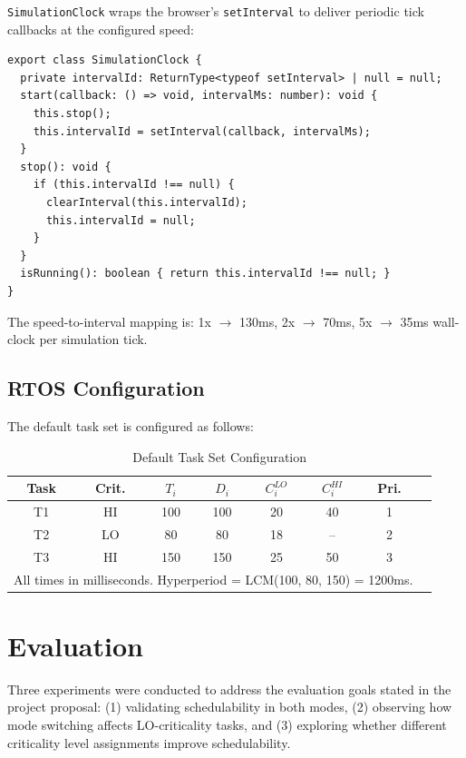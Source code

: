\documentclass[conference]{IEEEtran}
\begin{document}
\texttt{SimulationClock} wraps the browser's \texttt{setInterval} to deliver periodic tick callbacks at the configured speed:

\begin{lstlisting}[caption={Simulation clock (SimulationClock.ts)},label={lst:clock}]
export class SimulationClock {
  private intervalId: ReturnType<typeof setInterval> | null = null;
  start(callback: () => void, intervalMs: number): void {
    this.stop();
    this.intervalId = setInterval(callback, intervalMs);
  }
  stop(): void {
    if (this.intervalId !== null) {
      clearInterval(this.intervalId);
      this.intervalId = null;
    }
  }
  isRunning(): boolean { return this.intervalId !== null; }
}
\end{lstlisting}

The speed-to-interval mapping is: 1x $\rightarrow$ 130ms, 2x $\rightarrow$ 70ms, 5x $\rightarrow$ 35ms wall-clock per simulation tick.

\subsection{RTOS Configuration}

The default task set is configured as follows:

\begin{table}[h]
  \caption{Default Task Set Configuration}
  \centering
  \begin{tabular}{cccccccc}
    \toprule
    \textbf{Task} & \textbf{Crit.} & $T_i$ & $D_i$ & $C_i^{LO}$ & $C_i^{HI}$ & \textbf{Pri.} \\
    \midrule
    T1 & HI & 100 & 100 & 20 & 40 & 1 \\
    T2 & LO & 80  & 80  & 18 & -- & 2 \\
    T3 & HI & 150 & 150 & 25 & 50 & 3 \\
    \bottomrule
    \multicolumn{7}{l}{\small All times in milliseconds. Hyperperiod = LCM(100, 80, 150) = 1200ms.}
  \end{tabular}
  \label{tab:tasks}
\end{table}

\section{Evaluation}

Three experiments were conducted to address the evaluation goals stated in the project proposal: (1) validating schedulability in both modes, (2) observing how mode switching affects LO-criticality tasks, and (3) exploring whether different criticality level assignments improve schedulability.
\end{document}
